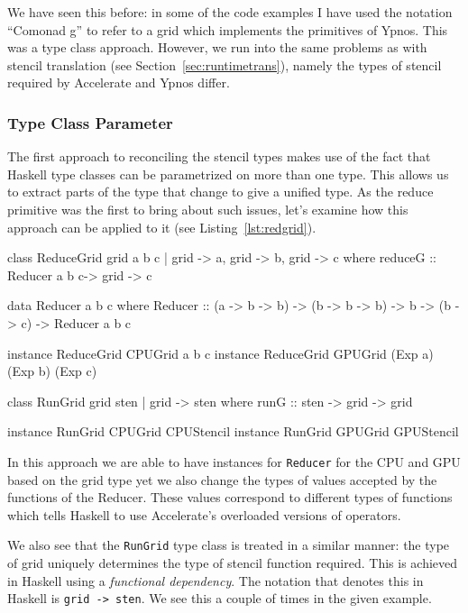 \documentclass[12pt,a4paper,twoside]{scrbook}
\begin{document}
We have seen this before: in some of the code examples I have used the notation
``Comonad g'' to refer to a grid which implements the primitives of Ypnos. This
was a type class approach. However, we run into the same problems as with
stencil translation (see Section~\ref{sec:runtimetrans}), namely the types of
stencil required by Accelerate and Ypnos differ.

\subsubsection{Type Class Parameter}

The first approach to reconciling the stencil types makes use of the fact that
Haskell type classes can be parametrized on more than one type. This allows us
to extract parts of the type that change to give a unified type. As the reduce
primitive was the first to bring about such issues, let's examine how this
approach can be applied to it (see Listing~\ref{lst:redgrid}).

\begin{hflisting}[label={lst:redgrid}, caption={The \texttt{ReduceGrid} type
  class defined with type parameters for each variable: \texttt{a}, \texttt{b}
  and \texttt{c}.}]
class ReduceGrid grid a b c | grid -> a,
                              grid -> b,
                              grid -> c where
    reduceG :: Reducer a b c-> grid -> c

data Reducer a b c where
    Reducer ::   (a -> b -> b)
              -> (b -> b -> b)
              -> b
              -> (b -> c)
              -> Reducer a b c

instance ReduceGrid CPUGrid a b c
instance ReduceGrid GPUGrid (Exp a) (Exp b) (Exp c)

class RunGrid grid sten | grid -> sten where
    runG :: sten -> grid -> grid

instance RunGrid CPUGrid CPUStencil
instance RunGrid GPUGrid GPUStencil
\end{hflisting}

In this approach we are able to have instances for \texttt{Reducer} for the CPU
and GPU based on the grid type yet we also change the types of values accepted
by the functions of the Reducer. These values correspond to different types of
functions which tells Haskell to use Accelerate's overloaded versions of
operators.

We also see that the \texttt{RunGrid} type class is treated in a similar manner:
the type of grid uniquely determines the type of stencil function required. This
is achieved in Haskell using a \emph{functional dependency}. The notation that
denotes this in Haskell is \texttt{grid -> sten}. We see this a
couple of times in the given example.
\end{document}
